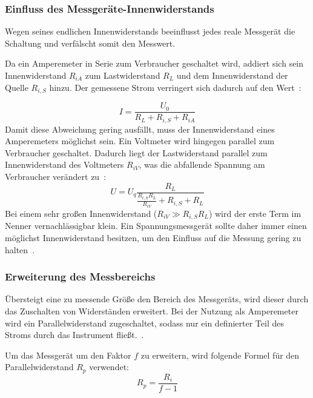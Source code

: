 \documentclass[12pt,a4paper,titlepage]{scrartcl}
\numberwithin{equation}{section}
\numberwithin{table}{section}
\numberwithin{figure}{section}
\begin{document}
\subsubsection{Einfluss des Messgeräte-Innenwiderstands}

Wegen seines endlichen Innenwiderstands beeinflusst jedes reale Messgerät die Schaltung und verfälscht somit den Messwert.

Da ein Amperemeter in Serie zum Verbraucher geschaltet wird,
addiert sich sein Innenwiderstand $R_{iA}$ zum Lastwiderstand $R_L$ und dem Innenwiderstand der Quelle $R_{i{,}S}$ hinzu.
Der gemessene Strom verringert sich dadurch auf den Wert~\cite{PAPskript}:

\begin{equation}
    I = \frac{U_0}{R_L + R_{i{,}S} + R_{iA}}
\end{equation}
Damit diese Abweichung gering ausfällt, muss der Innenwiderstand eines Amperemeters möglichst  sein.
Ein Voltmeter wird hingegen parallel zum Verbraucher geschaltet. Dadurch liegt der Lastwiderstand parallel
zum Innenwiderstand des Voltmeters $R_{iV}$,
was die abfallende Spannung am Verbraucher verändert zu~\cite{PAPskript}:
\begin{equation}
    U = U_q \frac{R_L}{\frac{R_{i{,}S}R_L}{R_{iV}} + R_{i{,}S} + R_L}
\end{equation}
Bei einem sehr großen Innenwiderstand ($R_{iV} \gg R_{i{,}S}R_L$) wird der erste Term im Nenner vernachlässigbar klein.
Ein Spannungsmessgerät sollte daher immer einen möglichst  Innenwiderstand besitzen, um den Einfluss auf die Messung gering zu halten~\cite{PAPskript}.

\subsubsection{Erweiterung des Messbereichs}
Übersteigt eine zu messende Größe den Bereich des Messgeräts, wird dieser durch das Zuschalten von Widerständen erweitert.
Bei der Nutzung als Amperemeter wird ein Parallelwiderstand zugeschaltet, sodass nur ein definierter Teil des Stroms durch das Instrument fließt.~\cite{PAPskript}.

\medskip
Um das Messgerät um den Faktor $f$ zu erweitern, wird folgende Formel für den Parallelwiderstand $R_p$ verwendet:
\begin{equation}
    R_p = \frac{R_i}{f-1}\label{eq:erweiterungAmperemeter}
\end{equation}
\end{document}
